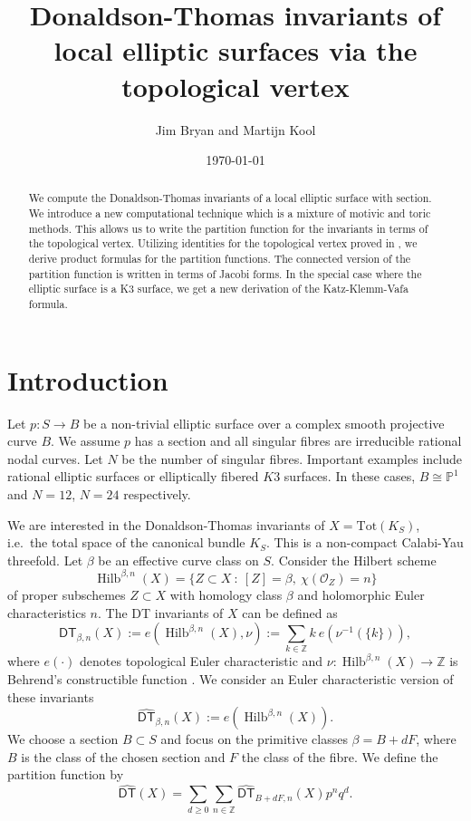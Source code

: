 \documentclass{amsart}
\title[DT invariants of local elliptic surfaces]{Donaldson-Thomas invariants of local elliptic surfaces via the topological vertex}
\author{Jim Bryan and Martijn Kool}
\date{\today}
\theoremstyle{definition}
\newcommand{\ZZ} {\mathbb{Z}}		%
\newcommand{\PP} {\mathbb{P}}
\renewcommand{\O}{\mathcal{O}}
\newcommand{\Hilb}{\operatorname{Hilb}}
\newcommand{\DT}{\mathsf{DT}}
\newcommand{\DThat}{\widehat{\DT}}
\begin{document}
\begin{abstract}

We compute the Donaldson-Thomas invariants of a local elliptic surface
with section. We introduce a new computational technique which is a
mixture of motivic and toric methods. This allows us to write the
partition function for the invariants in terms of the topological
vertex. Utilizing identities for the topological vertex proved in
\cite{BKY}, we derive product formulas for the partition
functions. The connected version of the partition function is written
in terms of Jacobi forms.  In the special case where the elliptic
surface is a K3 surface, we get a new derivation of the
Katz-Klemm-Vafa formula.
\end{abstract}

\maketitle 





\section{Introduction}

Let $p : S \rightarrow B$ be a non-trivial elliptic surface over a
complex smooth projective curve $B$. We assume $p$ has a section and
all singular fibres are irreducible rational nodal curves. Let $N$ be
the number of singular fibres. Important examples include rational
elliptic surfaces or elliptically fibered $K3$ surfaces. In these
cases, $B \cong \PP^1$ and $N = 12$, $N=24$ respectively.

We are interested in the Donaldson-Thomas invariants of $X =
\mathrm{Tot}(K_S)$, i.e.~the total space of the canonical bundle
$K_S$. This is a non-compact Calabi-Yau threefold. Let $\beta$ be an
effective curve class on $S$. Consider the Hilbert scheme
$$
\Hilb^{\beta,n}(X) = \{ Z \subset X \ : \ [Z] = \beta, \ \chi(\O_Z) = n\}
$$
of proper subschemes $Z \subset X$ with homology class $\beta$ and holomorphic Euler characteristics $n$. The DT invariants of $X$ can be defined as
$$
\DT_{\beta,n}(X) := e(\Hilb^{\beta,n}(X), \nu) := \sum_{k \in \ZZ} k \ e(\nu^{-1}(\{k\})),
$$
where $e(\cdot)$ denotes topological Euler characteristic and $\nu :
\Hilb^{\beta,n}(X) \rightarrow \ZZ$ is Behrend's constructible
function \cite{Beh}. We consider an Euler characteristic version of
these invariants
$$
\DThat _{\beta,n}(X) := e(\Hilb^{\beta,n}(X)).
$$
We choose a section $B \subset S$ and focus on the primitive classes
$\beta = B + dF$, where $B$ is the class of the chosen section and $F$
the class of the fibre. We define the partition function by
\[
\DThat (X) = \sum_{d \geq 0} \sum_{n \in \ZZ} \DThat _{B+dF,n}(X) p^n q^d.
\]
\end{document}
